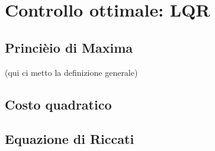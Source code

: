 \section{Controllo ottimale: LQR} 

\subsection{Princièio di Maxima}
(qui ci metto la definizione generale)

\subsection{Costo quadratico}

\subsection{Equazione di Riccati}